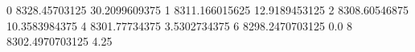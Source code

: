 0 8328.45703125 30.2099609375
1 8311.166015625 12.9189453125
2 8308.60546875 10.3583984375
4 8301.77734375 3.5302734375
6 8298.2470703125 0.0
8 8302.4970703125 4.25
